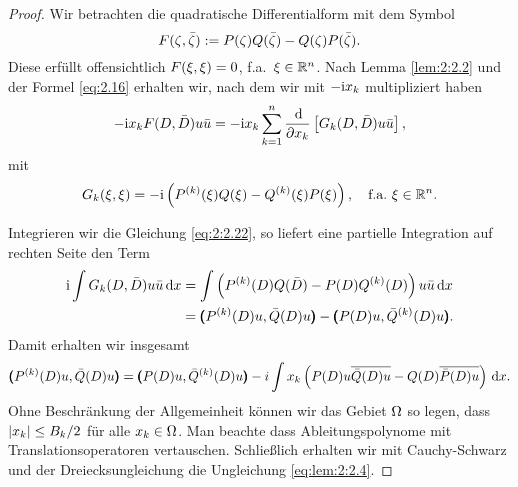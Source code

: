 \begin{proof}
Wir betrachten die quadratische Differentialform mit dem Symbol
\begin{equation}
F(\zeta,\bar{\zeta}):=P(\zeta)Q(\bar{\zeta})-Q(\zeta)P(\bar{\zeta}).
\end{equation}
Diese erfüllt offensichtlich $F(\xi,\xi)=0$, f.a.~$\xi\in\mathbb R^n$.
Nach Lemma \ref{lem:2:2.2} und der Formel \eqref{eq:2.16}
erhalten wir, nach dem wir mit $-\mathrm i x_k$ multipliziert haben
\begin{equation}\label{eq:2:2.22}
-\mathrm i x_kF(D,\bar{D})u\bar{u}=-\mathrm i x_k\sum_{k=1}^n\frac{\,\mathrm d}{\partial x_k}\left[G_k(D,\bar{D})u\bar{u}\right],
\end{equation}
mit
\begin{equation}
G_k(\xi,\xi)=-\mathrm i\left(P^{(k)}(\xi)Q(\xi)-Q^{(k)}(\xi)P(\xi)\right),
\quad\text{f.a.}~\xi\in\mathbb R^n.
\end{equation}

Integrieren wir die Gleichung \eqref{eq:2:2.22},
so liefert eine partielle Integration auf rechten Seite den Term
\begin{align}
\mathrm i\int G_k(D,\bar{D})u\bar{u}\,\mathrm d x&=\int\left(P^{(k)}(D)Q(\bar{D})-P(D)Q^{(k)}(D)\right)u\bar{u}\,\mathrm d x\\
&=\pmb(P^{(k)}(D)u,\bar{Q}(D)u\pmb)-\pmb(P(D)u,\bar{Q}^{(k)}(D)u\pmb).
\end{align}
Damit erhalten wir insgesamt
\begin{equation}
\pmb(P^{(k)}(D)u,\bar{Q}(D)u\pmb)
=\pmb(P(D)u,\bar{Q}^{(k)}(D)u\pmb)-i\int x_k\left(P(D)u\overline{\bar{Q}(D)u}-Q(D)\overline{\bar{P}(D)u}\right)\,\mathrm d x.
\end{equation}
Ohne Beschränkung der Allgemeinheit können wir das Gebiet $\Omega$ so legen,
dass $\lvert x_k\rvert\leq B_k/2$ für alle $x_k\in\Omega$.
Man beachte dass Ableitungspolynome mit Translationsoperatoren vertauschen.
Schließlich erhalten wir mit Cauchy-Schwarz
und der Dreiecksungleichung die Ungleichung \eqref{eq:lem:2:2.4}.
\end{proof}

